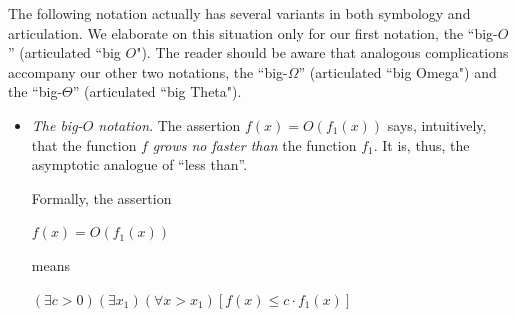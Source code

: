 \smallskip

The following notation actually has several variants in both symbology and articulation.  We elaborate on this situation only for our first notation, the ``big-$O$'' (articulated ``big $O$").  The reader should be aware that analogous complications accompany our other two notations, the ``big-$\Omega$'' (articulated ``big Omega") and the ``big-$\Theta$'' (articulated ``big Theta"). 
 
\begin{itemize}
\item
{\em The big-$O$ notation}.
The assertion $f(x) = O(f_1(x))$ says, intuitively, that the function $f$ {\em grows no faster than} the function $f_1$.  It is, thus, the asymptotic analogue of ``less than''.

\smallskip

Formally, the assertion

\hspace*{.2in}$f(x) = O(f_1(x))$

means

\hspace*{.2in}
$(\exists c >0)(\exists x_1)(\forall x > x_1)
[f(x) \leq c \cdot f_1(x)]$

\medskip

\noindent {}
\end{itemize}
